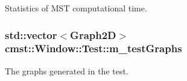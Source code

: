 Statistics of MST computational time. 

\subsubsection[{\texorpdfstring{m\_testGraphs}{m_testGraphs}}]{\setlength{\rightskip}{0pt plus 5cm}std::vector$<${\bf Graph2D}$>$ cmst::Window::Test::m\_testGraphs}\hypertarget{structcmst_1_1_window_1_1_test_a42f44814c524399a3c1f547a64218c1a}{}\label{structcmst_1_1_window_1_1_test_a42f44814c524399a3c1f547a64218c1a}


The graphs generated in the test. 

